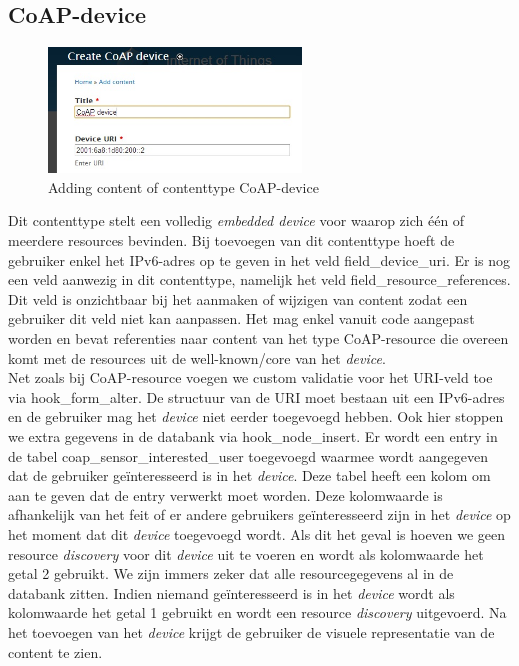 \subsection{CoAP-device}
\begin{figure}
\vspace{-10pt}
\centering
\label{fig:addCoapDevice}
\includegraphics[width=0.6\textwidth]{fig/add_coap_device}
\vspace{-20pt}
\centering
\caption{Adding content of contenttype CoAP-device}
\centering
\vspace{-20pt}
\end{figure}
Dit contenttype stelt een volledig \textit{embedded device} voor waarop zich \'{e}\'{e}n of meerdere resources bevinden. Bij toevoegen van dit contenttype hoeft de gebruiker enkel het IPv6-adres op te geven in het veld field\_device\_uri. Er is nog een veld aanwezig in dit contenttype, namelijk het veld field\_resource\_references. Dit veld is onzichtbaar bij het aanmaken of wijzigen van content zodat een gebruiker dit veld niet kan aanpassen. Het mag enkel vanuit code aangepast worden en bevat referenties naar content van het type CoAP-resource die overeen komt met de resources uit de well-known/core van het \textit{device}.\\

Net zoals bij CoAP-resource voegen we custom validatie voor het URI-veld toe via hook\_form\_alter. De structuur van de URI moet bestaan uit een IPv6-adres en de gebruiker mag het \textit{device} niet eerder toegevoegd hebben. Ook hier stoppen we extra gegevens in de databank via hook\_node\_insert. Er wordt een entry in de tabel coap\_sensor\_interested\_user toegevoegd waarmee wordt aangegeven dat de gebruiker ge\"{i}nteresseerd is in het \textit{device}. Deze tabel heeft een kolom om aan te geven dat de entry verwerkt moet worden. Deze kolomwaarde is afhankelijk van het feit of er andere gebruikers ge\"{i}nteresseerd zijn in het \textit{device} op het moment dat dit \textit{device} toegevoegd wordt. Als dit het geval is hoeven we geen resource \textit{discovery} voor dit \textit{device} uit te voeren en wordt als kolomwaarde het getal 2 gebruikt. We zijn immers zeker dat alle resourcegegevens al in de databank zitten. Indien niemand ge\"{i}nteresseerd is in het \textit{device} wordt als kolomwaarde het getal 1 gebruikt en wordt een resource \textit{discovery} uitgevoerd. Na het toevoegen van het \textit{device} krijgt de gebruiker de visuele representatie van de content te zien.\\


